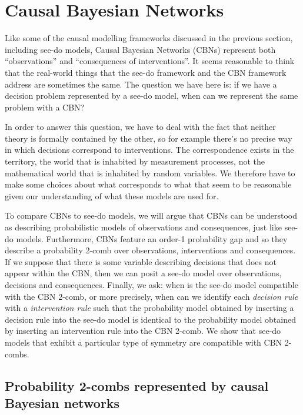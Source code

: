 \section{Causal Bayesian Networks}\label{sec:CBN}

Like some of the causal modelling frameworks discussed in the previous section, including see-do models, Causal Bayesian Networks (CBNs) represent both ``observations'' and ``consequences of interventions''. It seems reasonable to think that the real-world things that the see-do framework and the CBN framework address are sometimes the same. The question we have here is: if we have a decision problem represented by a see-do model, when can we represent the same problem with a CBN?

In order to answer this question, we have to deal with the fact that neither theory is formally contained by the other, so for example there's no precise way in which decisions correspond to interventions. The correspondence exists in the territory, the world that is inhabited by measurement processes, not the mathematical world that is inhabited by random variables. We therefore have to make some choices about what corresponds to what that seem to be reasonable given our understanding of what these models are used for.

To compare CBNs to see-do models, we will argue that CBNs can be understood as describing probabilistic models of observations and consequences, just like see-do models. Furthermore, CBNs feature an order-1 probability gap and so they describe a probability 2-comb over observations, interventions and consequences. If we suppose that there is some variable describing decisions that does not appear within the CBN, then we can posit a see-do model over observations, decisions and consequences. Finally, we ask: when is the see-do model compatible with the CBN 2-comb, or more precisely, when can we identify each \emph{decision rule} with a \emph{intervention rule} such that the probability model obtained by inserting a decision rule into the see-do model is identical to the probability model obtained by inserting an intervention rule into the CBN 2-comb. We show that see-do models that exhibit a particular type of symmetry are compatible with CBN 2-combs.

\subsection{Probability 2-combs represented by causal Bayesian networks}


